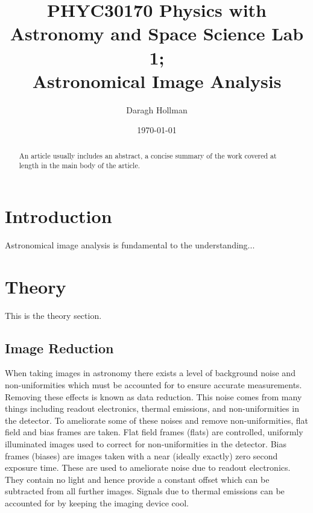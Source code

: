 \documentclass[%
reprint,
amsmath,amssymb,
aps,
]{revtex4-2}
\begin{document}
	
	
	\title{PHYC30170 Physics with Astronomy and Space Science Lab 1;\\Astronomical Image Analysis}%
	
	\author{Daragh Hollman}
	
	\date{\today}
	
	\begin{abstract}
		An article usually includes an abstract, a concise summary of the work
		covered at length in the main body of the article. 
	\end{abstract}

	\maketitle
	
	\section{Introduction}

		Astronomical image analysis is fundamental to the understanding...
	
	
	\section{Theory}
	
		This is the theory section.
	
		\subsection{Image Reduction}
			When taking images in astronomy there exists a level of background noise and non-uniformities which must be accounted for to ensure accurate measurements. Removing these effects is known as data reduction\cite{manual}. This noise comes from many things including readout electronics, thermal emissions, and non-uniformities in the detector\cite{astropy}. To ameliorate some of these noises and remove non-uniformities, flat field and bias frames are taken. Flat field frames (flats) are controlled, uniformly illuminated images used to correct for non-uniformities in the detector. Bias frames (biases) are images taken with a near (ideally exactly) zero second exposure time. These are used to ameliorate noise due to readout electronics. They contain no light and hence provide a constant offset which can be subtracted from all further images. Signals due to thermal emissions can be accounted for by keeping the imaging device cool.\\
		
\end{document}
